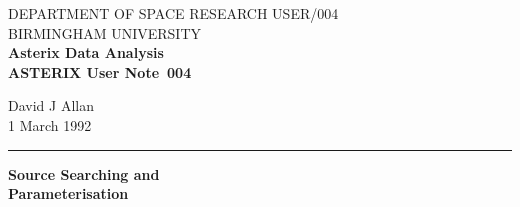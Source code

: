 \pagestyle{myheadings}
\newcommand{\astdoccategory}  {ASTERIX User Note}
\newcommand{\astdocinitials}  {USER}
\newcommand{\astdocnumber}    {004}
\newcommand{\astdocauthors}   {David J Allan}
\newcommand{\astdocdate}      {1 March 1992}
\newcommand{\astdoctitle}     {Source Searching and\\Parameterisation}
\newcommand{\astdocname}      {\astdocinitials /\astdocnumber}
\newcommand{\apar}[1]         {{\tt #1}}
\newcommand{\mode}[1]         {{#1}} 
\newcommand{\ahelp}[1]        {{Ref~5,``{\em #1}"}} 
\renewcommand{\_}             {{\tt\char'137}}

\newcommand{\PARtabstart}
{\begin{center}\begin{tabular}{|l|l|} \hline}

\newcommand{\PARtabitem}[2]
{#1 & #2 \\ \hline}

\newcommand{\PARtabend}
{\end{tabular}\end{center}}


\setlength{\textwidth}{160mm}           %
\setlength{\textheight}{240mm}          %
\setlength{\oddsidemargin}{0pt}         %
\setlength{\evensidemargin}{0pt}        %
\setlength{\topmargin}{-5mm}            %
\setlength{\headsep}{8mm}               %
\setlength{\parindent}{0mm}

\thispagestyle{empty}
DEPARTMENT OF SPACE RESEARCH \hfill \astdocname\\
BIRMINGHAM UNIVERSITY\\
{\large\bf Asterix Data Analysis\\}
{\large\bf \astdoccategory\ \astdocnumber}
\begin{flushright}
\astdocauthors\\
\astdocdate
\end{flushright}
\vspace{-4mm}
\rule{\textwidth}{0.5mm}
\vspace{5mm}
\begin{center}
{\huge\bf \astdoctitle}
\end{center}
\vspace{5mm}

